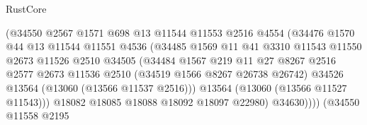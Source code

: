 \begin{lexlean}{RustCore}
\begin{coremodule}
                                    (@34550
                                      @2567
                                      @1571
                                      @698
                                      @13
                                      @11544
                                      @11553
                                      @2516
                                      @4554
                                      (@34476
                                        @1570
                                        @44
                                        @13
                                        @11544
                                        @11551
                                        @4536
                                        (@34485
                                          @1569
                                          @11
                                          @41
                                          @3310
                                          @11543
                                          @11550
                                          @2673
                                          @11526
                                          @2510
                                          @34505
                                          (@34484
                                            @1567
                                            @219
                                            @11
                                            @27
                                            @8267
                                            @2516
                                            @2577
                                            @2673
                                            @11536
                                            @2510
                                            (@34519 @1566 @8267 @26738 @26742)
                                            @34526
                                            @13564
                                            (@13060 (@13566 @11537 @2516)))
                                          @13564
                                          (@13060 (@13566 @11527 @11543)))
                                        @18082
                                        @18085
                                        @18088
                                        @18092
                                        @18097
                                        @22980)
                                      @34630))))
                              (@34550
                                @11558
                                @2195

\end{coremodule}
\end{lexlean}
